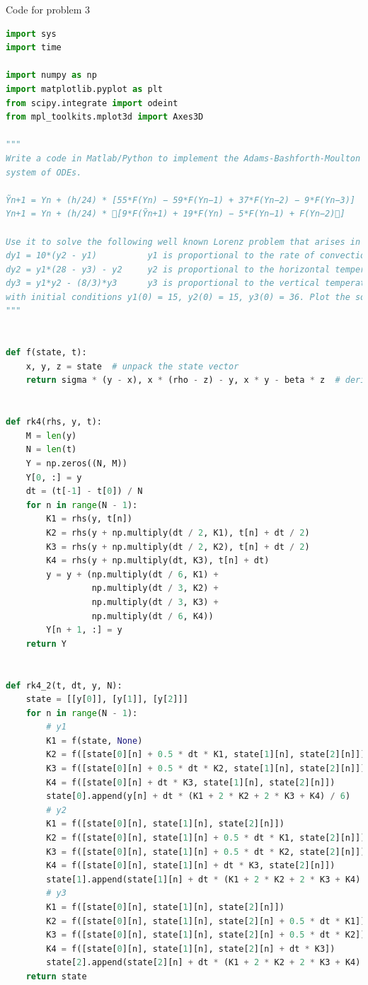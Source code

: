 \documentclass[11pt]{article}
\begin{document}
Code for problem 3
\begin{lstlisting}[language=Python]
import sys
import time

import numpy as np
import matplotlib.pyplot as plt
from scipy.integrate import odeint
from mpl_toolkits.mplot3d import Axes3D

"""
Write a code in Matlab/Python to implement the Adams-Bashforth-Moulton method of fourth order for the autonomous
system of ODEs.

Ỹn+1 = Yn + (h/24) * [55*F(Yn) − 59*F(Yn−1) + 37*F(Yn−2) − 9*F(Yn−3)]  -   Adams–Bashforth method
Yn+1 = Yn + (h/24) * 􏰆[9*F(Ỹn+1) + 19*F(Yn) − 5*F(Yn−1) + F(Yn−2)􏰇]      -   Adams–Moulton method

Use it to solve the following well known Lorenz problem that arises in the study of dynamical systems
dy1 = 10*(y2 - y1)          y1 is proportional to the rate of convection
dy2 = y1*(28 - y3) - y2     y2 is proportional to the horizontal temperature variation
dy3 = y1*y2 - (8/3)*y3      y3 is proportional to the vertical temperature variation
with initial conditions y1(0) = 15, y2(0) = 15, y3(0) = 36. Plot the solution curves for 0 ≤ t ≤ 20.
"""


def f(state, t):
    x, y, z = state  # unpack the state vector
    return sigma * (y - x), x * (rho - z) - y, x * y - beta * z  # derivatives


def rk4(rhs, y, t):
    M = len(y)
    N = len(t)
    Y = np.zeros((N, M))
    Y[0, :] = y
    dt = (t[-1] - t[0]) / N
    for n in range(N - 1):
        K1 = rhs(y, t[n])
        K2 = rhs(y + np.multiply(dt / 2, K1), t[n] + dt / 2)
        K3 = rhs(y + np.multiply(dt / 2, K2), t[n] + dt / 2)
        K4 = rhs(y + np.multiply(dt, K3), t[n] + dt)
        y = y + (np.multiply(dt / 6, K1) +
                 np.multiply(dt / 3, K2) +
                 np.multiply(dt / 3, K3) +
                 np.multiply(dt / 6, K4))
        Y[n + 1, :] = y
    return Y


def rk4_2(t, dt, y, N):
    state = [[y[0]], [y[1]], [y[2]]]
    for n in range(N - 1):
        # y1
        K1 = f(state, None)
        K2 = f([state[0][n] + 0.5 * dt * K1, state[1][n], state[2][n]])
        K3 = f([state[0][n] + 0.5 * dt * K2, state[1][n], state[2][n]])
        K4 = f([state[0][n] + dt * K3, state[1][n], state[2][n]])
        state[0].append(y[n] + dt * (K1 + 2 * K2 + 2 * K3 + K4) / 6)
        # y2
        K1 = f([state[0][n], state[1][n], state[2][n]])
        K2 = f([state[0][n], state[1][n] + 0.5 * dt * K1, state[2][n]])
        K3 = f([state[0][n], state[1][n] + 0.5 * dt * K2, state[2][n]])
        K4 = f([state[0][n], state[1][n] + dt * K3, state[2][n]])
        state[1].append(state[1][n] + dt * (K1 + 2 * K2 + 2 * K3 + K4) / 6)
        # y3
        K1 = f([state[0][n], state[1][n], state[2][n]])
        K2 = f([state[0][n], state[1][n], state[2][n] + 0.5 * dt * K1])
        K3 = f([state[0][n], state[1][n], state[2][n] + 0.5 * dt * K2])
        K4 = f([state[0][n], state[1][n], state[2][n] + dt * K3])
        state[2].append(state[2][n] + dt * (K1 + 2 * K2 + 2 * K3 + K4) / 6)
    return state



\end{lstlisting}
\end{document}
